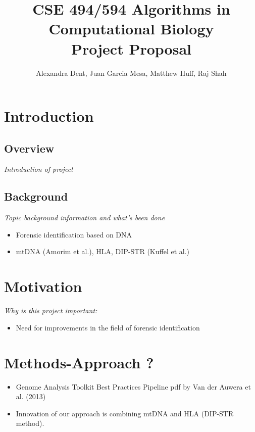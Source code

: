 \documentclass[12pt]{article}
\title{CSE 494/594 Algorithms in Computational Biology \\
		Project Proposal}
\author{Alexandra Dent, Juan Garcia Mesa, Matthew Huff, Raj Shah}
\begin{document}
\maketitle

\section{Introduction}
\subsection{Overview}
\textit{Introduction of project}


\subsection{Background}
\textit{Topic background information and what's been done}

\begin{itemize}
	\item Forensic identification based on DNA
	\item mtDNA (Amorim et al.), HLA, DIP-STR (Kuffel et al.) 
\end{itemize}

\section{Motivation}
\textit{Why is this project important:}

\begin{itemize}
	\item Need for improvements in the field of forensic identification
\end{itemize}



\section{Methods-Approach ?}

\begin{itemize}
	\item Genome Analysis Toolkit Best Practices Pipeline pdf by Van der Auwera et al. (2013)
	\item Innovation of our approach is combining mtDNA and HLA (DIP-STR method).
\end{itemize}

\end{document}
